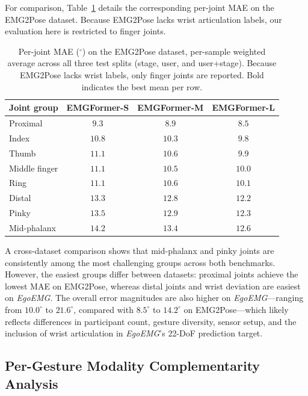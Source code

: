 \documentclass{article}
\newcommand{\dataset}{\textit{EgoEMG}}
\newcommand{\model}{EMGFormer}
\begin{document}
For comparison, Table~\ref{tab:per_joint_emg2pose} details the corresponding per-joint MAE on the EMG2Pose dataset. Because EMG2Pose lacks wrist articulation labels, our evaluation here is restricted to finger joints.

\begin{table}[h]
\centering
\caption{Per-joint MAE ($^\circ$) on the EMG2Pose dataset, per-sample weighted average across all three test splits (stage, user, and user+stage). Because EMG2Pose lacks wrist labels, only finger joints are reported. Bold indicates the best mean per row.}
\label{tab:per_joint_emg2pose}
\footnotesize
\setlength{\tabcolsep}{3.5pt}
\renewcommand{\arraystretch}{1.05}
\begin{tabular}{lccc}
\toprule
Joint group & \model{}-S & \model{}-M & \model{}-L \\
\midrule
Proximal & $9.3$ & $8.9$ & $\mathbf{8.5}$ \\
Index & $10.8$ & $10.3$ & $\mathbf{9.8}$ \\
Thumb & $11.1$ & $10.6$ & $\mathbf{9.9}$ \\
Middle finger & $11.1$ & $10.5$ & $\mathbf{10.0}$ \\
Ring & $11.1$ & $10.6$ & $\mathbf{10.1}$ \\
Distal & $13.3$ & $12.8$ & $\mathbf{12.2}$ \\
Pinky & $13.5$ & $12.9$ & $\mathbf{12.3}$ \\
Mid-phalanx & $14.2$ & $13.4$ & $\mathbf{12.6}$ \\
\bottomrule
\end{tabular}
\end{table}

A cross-dataset comparison shows that mid-phalanx and pinky joints are consistently among the most challenging groups across both benchmarks. However, the easiest groups differ between datasets: proximal joints achieve the lowest MAE on EMG2Pose, whereas distal joints and wrist deviation are easiest on \dataset{}. The overall error magnitudes are also higher on \dataset{}---ranging from $10.0^\circ$ to $21.6^\circ$, compared with $8.5^\circ$ to $14.2^\circ$ on EMG2Pose---which likely reflects differences in participant count, gesture diversity, sensor setup, and the inclusion of wrist articulation in \dataset{}'s 22-DoF prediction target.

\subsection{Per-Gesture Modality Complementarity Analysis}
\label{app:per_gesture}
\end{document}
